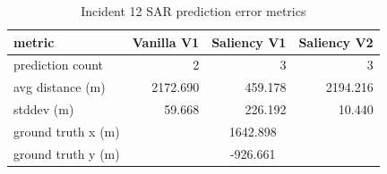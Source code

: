 \begin{table}[ht]
\centering
\caption{Incident 12 SAR prediction error metrics}
\label{tab:sar-incident-12}
\begin{tabular}{lrrr}
\hline
metric & Vanilla V1 & Saliency V1 & Saliency V2 \\
\hline
prediction count & 2 & 3 & 3 \\
avg distance (m) & 2172.690 & 459.178 & 2194.216 \\
stddev (m) & 59.668 & 226.192 & 10.440 \\
ground truth x (m) & \multicolumn{3}{c}{1642.898} \\
ground truth y (m) & \multicolumn{3}{c}{-926.661} \\
\hline
\end{tabular}
\end{table}
